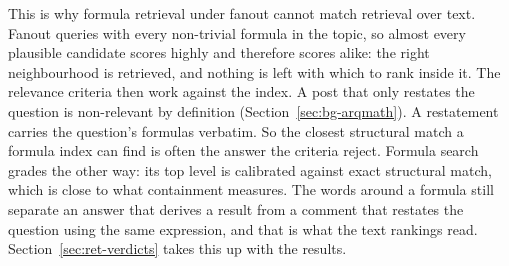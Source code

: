 This is why formula retrieval under fanout cannot match retrieval over text. Fanout queries with
every non-trivial formula in the topic, so almost every plausible candidate scores highly and
therefore scores alike: the right neighbourhood is retrieved, and nothing is left with which to
rank inside it. The relevance criteria then work against the index. A post that only restates the
question is non-relevant by definition (Section~\ref{sec:bg-arqmath}). A restatement carries the
question's formulas verbatim. So the closest structural match a formula index can find is often
the answer the criteria reject. Formula search grades the other way: its top level is calibrated
against exact structural match, which is close to what containment measures. The words around a
formula still separate an answer that derives a result from a comment that restates the question
using the same expression, and that is what the text rankings read.
Section~\ref{sec:ret-verdicts} takes this up with the results.


